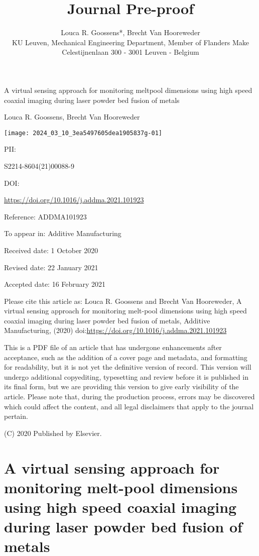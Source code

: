 \documentclass[10pt]{article}
\title{Journal Pre-proof }
\author{Louca R. Goossens*, Brecht Van Hooreweder\\
KU Leuven, Mechanical Engineering Department, Member of Flanders Make\\
Celestijnenlaan 300 - 3001 Leuven - Belgium}
\date{}
\begin{document}
\maketitle
A virtual sensing approach for monitoring meltpool dimensions using high speed coaxial imaging during laser powder bed fusion of metals

Louca R. Goossens, Brecht Van Hooreweder

\begin{center}
\texttt{[image: 2024\_03\_10\_3ea5497605dea1905837g-01]}
\end{center}

PII:

S2214-8604(21)00088-9

DOI:

\href{https://doi.org/10.1016/j.addma.2021.101923}{https://doi.org/10.1016/j.addma.2021.101923}

Reference: ADDMA101923

To appear in: Additive Manufacturing

Received date: 1 October 2020

Revised date: 22 January 2021

Accepted date: 16 February 2021

Please cite this article as: Louca R. Goossens and Brecht Van Hooreweder, A virtual sensing approach for monitoring melt-pool dimensions using high speed coaxial imaging during laser powder bed fusion of metals, Additive Manufacturing, (2020) doi:\href{https://doi.org/10.1016/j.addma.2021.101923}{https://doi.org/10.1016/j.addma.2021.101923}

This is a PDF file of an article that has undergone enhancements after acceptance, such as the addition of a cover page and metadata, and formatting for readability, but it is not yet the definitive version of record. This version will undergo additional copyediting, typesetting and review before it is published in its final form, but we are providing this version to give early visibility of the article. Please note that, during the production process, errors may be discovered which could affect the content, and all legal disclaimers that apply to the journal pertain.

(C) 2020 Published by Elsevier.

\section*{A virtual sensing approach for monitoring melt-pool dimensions using high speed coaxial imaging during laser powder bed fusion of metals }
\end{document}
